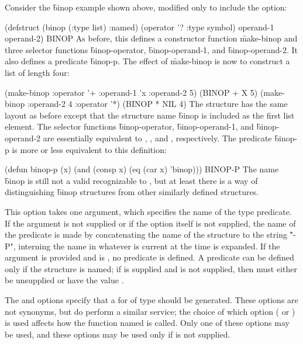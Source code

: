 Consider the \f{binop} example shown above, modified only to
include the  option:

\code
 (defstruct (binop (:type list) :named)
   (operator '? :type symbol)
   operand-1
   operand-2) \EV BINOP
\endcode
As before, this defines a constructor function \f{make-binop} and three
selector functions \f{binop-operator}, \f{binop-operand-1},
and \f{binop-operand-2}.  It also defines a predicate \f{binop-p}.
The effect of \f{make-binop} is now to construct a list of length four:

\code
 (make-binop :operator '+ :operand-1 'x :operand-2 5) \EV (BINOP + X 5)
 (make-binop :operand-2 4 :operator '*) \EV (BINOP * NIL 4)
\endcode
The structure has the same layout as before except that the structure name
\f{binop} is included as the first list element.
The selector functions
\f{binop-operator}, \f{binop-operand-1},
and \f{binop-operand-2} are essentially equivalent to ,
, and , respectively.
The predicate \f{binop-p} is more or less equivalent to this
definition:

\code
 (defun binop-p (x)
   (and (consp x) (eq (car x) 'binop))) \EV BINOP-P
\endcode
The name \f{binop} is still not a valid  recognizable
to , but at least there is a way of distinguishing \f{binop}
structures from other similarly defined structures.



This option takes one argument, which specifies the name of the type predicate.
If the argument is not supplied or if the option itself is not
supplied, the name of the predicate is made by concatenating the
name of the structure to the string \f{"-P"}, interning the name
in whatever  is current at the time 
is expanded.
If the argument is provided and is \nil, no predicate is defined.
A predicate can be defined only if the structure is named;
if  is supplied and  is not supplied,
then  must either be unsupplied or have the value \nil.


The  and  
options
specify that a 
 for  of type  should be generated.
These options are not synonyms, but do perform a similar service;
the choice of which option ( or ) is used 
affects how the function named  is called.
Only one of these options may be used, and
these options may be used only if  is not supplied.

